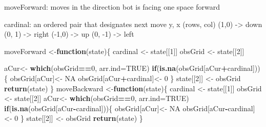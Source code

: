\documentclass[]{article}
\newenvironment{Shaded}{\begin{snugshade}}{\end{snugshade}}
\newcommand{\ControlFlowTok}[1]{\textcolor[rgb]{0.13,0.29,0.53}{\textbf{#1}}}
\newcommand{\DataTypeTok}[1]{\textcolor[rgb]{0.13,0.29,0.53}{#1}}
\newcommand{\DecValTok}[1]{\textcolor[rgb]{0.00,0.00,0.81}{#1}}
\newcommand{\KeywordTok}[1]{\textcolor[rgb]{0.13,0.29,0.53}{\textbf{#1}}}
\newcommand{\NormalTok}[1]{#1}
\newcommand{\OperatorTok}[1]{\textcolor[rgb]{0.81,0.36,0.00}{\textbf{#1}}}
\newcommand{\OtherTok}[1]{\textcolor[rgb]{0.56,0.35,0.01}{#1}}
\newcommand{\StringTok}[1]{\textcolor[rgb]{0.31,0.60,0.02}{#1}}
\begin{document}
moveForward: moves in the direction bot is facing one space forward

cardinal: an ordered pair that designates next move y, x (rows, col)
(1,0) -\textgreater{} down (0, 1) -\textgreater{} right (-1,0)
-\textgreater{} up (0, -1) -\textgreater{} left

\begin{Shaded}
\begin{Highlighting}[]
\NormalTok{moveForward <-}\ControlFlowTok{function}\NormalTok{(state)\{}
\NormalTok{  cardinal <-}\StringTok{ }\NormalTok{state[[}\DecValTok{1}\NormalTok{]]}
\NormalTok{  obsGrid <-}\StringTok{ }\NormalTok{state[[}\DecValTok{2}\NormalTok{]]}
  
\NormalTok{  aCur<-}\StringTok{ }\KeywordTok{which}\NormalTok{(obsGrid}\OperatorTok{==}\DecValTok{0}\NormalTok{, }\DataTypeTok{arr.ind=}\OtherTok{TRUE}\NormalTok{)}
  \ControlFlowTok{if}\NormalTok{(}\KeywordTok{is.na}\NormalTok{(obsGrid[aCur}\OperatorTok{+}\NormalTok{cardinal]))\{}
\NormalTok{    obsGrid[aCur]<-}\StringTok{ }\OtherTok{NA}
\NormalTok{    obsGrid[aCur}\OperatorTok{+}\NormalTok{cardinal]<-}\StringTok{ }\DecValTok{0}
\NormalTok{  \}}
\NormalTok{  state[[}\DecValTok{2}\NormalTok{]] <-}\StringTok{ }\NormalTok{obsGrid}
  \KeywordTok{return}\NormalTok{(state)}
\NormalTok{\}}
\NormalTok{moveBackward <-}\ControlFlowTok{function}\NormalTok{(state)\{}
\NormalTok{  cardinal <-}\StringTok{ }\NormalTok{state[[}\DecValTok{1}\NormalTok{]]}
\NormalTok{  obsGrid <-}\StringTok{ }\NormalTok{state[[}\DecValTok{2}\NormalTok{]]}
\NormalTok{  aCur<-}\StringTok{ }\KeywordTok{which}\NormalTok{(obsGrid}\OperatorTok{==}\DecValTok{0}\NormalTok{, }\DataTypeTok{arr.ind=}\OtherTok{TRUE}\NormalTok{)}
  \ControlFlowTok{if}\NormalTok{(}\KeywordTok{is.na}\NormalTok{(obsGrid[aCur}\OperatorTok{-}\NormalTok{cardinal]))\{}
\NormalTok{    obsGrid[aCur]<-}\StringTok{ }\OtherTok{NA}
\NormalTok{    obsGrid[aCur}\OperatorTok{-}\NormalTok{cardinal]<-}\StringTok{ }\DecValTok{0}
\NormalTok{  \}}
\NormalTok{  state[[}\DecValTok{2}\NormalTok{]] <-}\StringTok{ }\NormalTok{obsGrid}
   \KeywordTok{return}\NormalTok{(state)}
\NormalTok{\}}


\end{Highlighting}
\end{Shaded}
\end{document}

